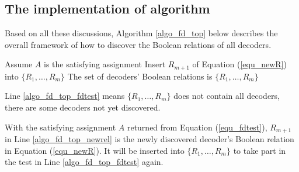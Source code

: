 \documentclass[journal]{IEEEtran}
\begin{document}
%

\subsection{The implementation of algorithm}\label{subsec_fd_top}

Based on all these discussions,
Algorithm \ref{algo_fd_top} below describes the overall framework of how to discover the Boolean relations of all decoders.

\begin{algorithm}
\caption{$DiscoveringDecoders$}
\label{algo_fd_top}
\begin{algorithmic}[1]
\label{algo_fd_top_fdtest}
\STATE Assume $A$ is the satisfying assignment
\STATE Insert $R_{m+1}$ of Equation (\ref{equ_newR}) into $\{R_1,\dots,R_m\}$
\label{algo_fd_top_newrel}
\ENDWHILE
\STATE The set of decoders' Boolean relations is $\{R_1,\dots,R_m\}$
\end{algorithmic}
\end{algorithm}


Line \ref{algo_fd_top_fdtest} means $\{R_1,\dots,R_m\}$ does not contain all decoders,
there are some decoders not yet discovered.

With the satisfying assignment $A$ returned from Equation (\ref{equ_fdtest}),
$R_{m+1}$ in Line \ref{algo_fd_top_newrel} is the newly discovered decoder's Boolean relation in Equation (\ref{equ_newR}).
It will be inserted into $\{R_1,\dots,R_m\}$ to take part in the test in Line \ref{algo_fd_top_fdtest} again.
\end{document}
